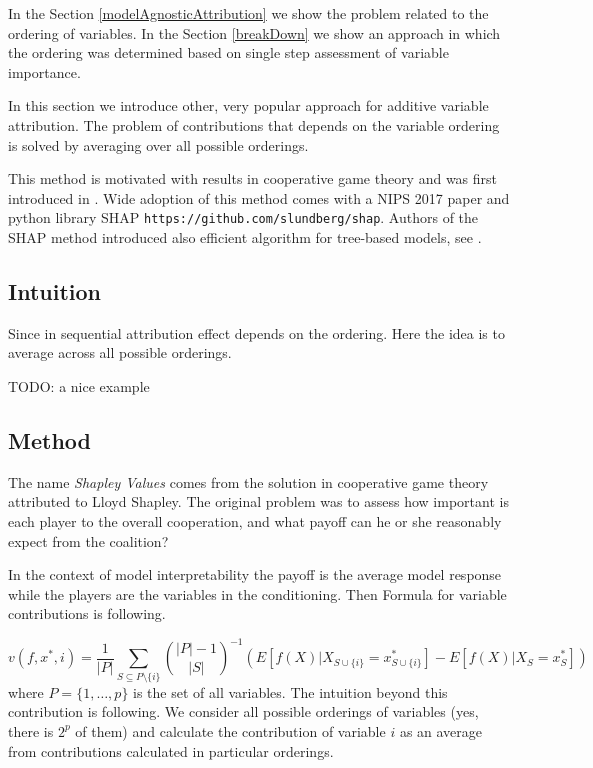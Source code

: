 \documentclass[]{krantz}
\theoremstyle{definition}
\theoremstyle{definition}
\theoremstyle{definition}
\theoremstyle{remark}
\begin{document}
In the Section \ref{modelAgnosticAttribution} we show the problem
related to the ordering of variables. In the Section \ref{breakDown} we
show an approach in which the ordering was determined based on single
step assessment of variable importance.

In this section we introduce other, very popular approach for additive
variable attribution. The problem of contributions that depends on the
variable ordering is solved by averaging over all possible orderings.

This method is motivated with results in cooperative game theory and was
first introduced in \citep{Strumbelj2014}. Wide adoption of this method
comes with a NIPS 2017 paper \citep{SHAP} and python library SHAP
\texttt{https://github.com/slundberg/shap}. Authors of the SHAP method
introduced also efficient algorithm for tree-based models, see
\citep{TreeSHAP}.

\hypertarget{intuition-3}{%
\subsection{Intuition}\label{intuition-3}}

Since in sequential attribution effect depends on the ordering. Here the
idea is to average across all possible orderings.

TODO: a nice example

\hypertarget{method-3}{%
\subsection{Method}\label{method-3}}

The name \emph{Shapley Values} comes from the solution in cooperative
game theory attributed to Lloyd Shapley. The original problem was to
assess how important is each player to the overall cooperation, and what
payoff can he or she reasonably expect from the coalition?
\citep{shapleybook1952}

In the context of model interpretability the payoff is the average model
response while the players are the variables in the conditioning. Then
Formula for variable contributions is following.

\[
v(f, x^*, i) = \frac 1{|P|}\sum_{S \subseteq P\setminus \{i\}}  {{|P|-1}\choose{|S|}}^{-1} \left(E [f(X) | X_{S \cup \{i\}} = x^*_{S \cup \{i\}}] - E [f(X) | X_{S} = x^*_{S}]\right)
\] where \(P = \{1, \ldots, p\}\) is the set of all variables. The
intuition beyond this contribution is following. We consider all
possible orderings of variables (yes, there is \(2^p\) of them) and
calculate the contribution of variable \(i\) as an average from
contributions calculated in particular orderings.
\end{document}
